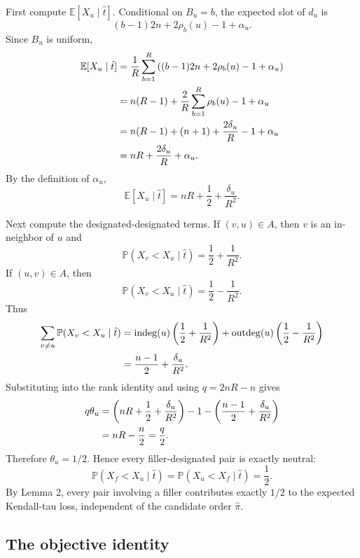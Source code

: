 \documentclass[11pt]{article}
\newcommand{\E}{\mathbb{E}}
\newcommand{\Prb}{\mathbb{P}}
\newcommand{\indeg}{\operatorname{indeg}}
\newcommand{\outdeg}{\operatorname{outdeg}}
\begin{document}
First compute $\E[X_u\mid \hat t]$.  Conditional on $B_u=b$, the expected slot of $d_u$ is
\begin{equation}
  (b-1)2n+2\rho_b(u)-1+\alpha_u.
\end{equation}
Since $B_u$ is uniform,
\begin{align}
  \E[X_u\mid \hat t]
  &=\frac1R\sum_{b=1}^R\left((b-1)2n+2\rho_b(u)-1+\alpha_u\right) \notag\\
  &=n(R-1)+\frac2R\sum_{b=1}^R\rho_b(u)-1+\alpha_u \notag\\
  &=n(R-1)+(n+1)+\frac{2\delta_u}{R}-1+\alpha_u \notag\\
  &=nR+\frac{2\delta_u}{R}+\alpha_u.
\end{align}
By the definition of $\alpha_u$,
\begin{equation}
  \E[X_u\mid \hat t]=nR+\frac12+\frac{\delta_u}{R^2}.
\end{equation}

Next compute the designated-designated terms.  If $(v,u)\in A$, then $v$ is an in-neighbor of $u$ and
\begin{equation}
  \Prb(X_v<X_u\mid \hat t)=\frac12+\frac1{R^2}.
\end{equation}
If $(u,v)\in A$, then
\begin{equation}
  \Prb(X_v<X_u\mid \hat t)=\frac12-\frac1{R^2}.
\end{equation}
Thus
\begin{align}
  \sum_{v\ne u}\Prb(X_v<X_u\mid \hat t)
  &=\indeg(u)\left(\frac12+\frac1{R^2}\right)
    +\outdeg(u)\left(\frac12-\frac1{R^2}\right) \notag\\
  &=\frac{n-1}{2}+\frac{\delta_u}{R^2}.
\end{align}
Substituting into the rank identity and using $q=2nR-n$ gives
\begin{align}
  q\theta_u
  &=\left(nR+\frac12+\frac{\delta_u}{R^2}\right)-1
    -\left(\frac{n-1}{2}+\frac{\delta_u}{R^2}\right) \notag\\
  &=nR-\frac n2
  =\frac q2.
\end{align}
Therefore $\theta_u=1/2$.  Hence every filler-designated pair is exactly neutral:
\begin{equation}
  \Prb(X_f<X_u\mid \hat t)=\Prb(X_u<X_f\mid \hat t)=\frac12.
\end{equation}
By Lemma 2, every pair involving a filler contributes exactly $1/2$ to the expected Kendall-tau loss, independent of the candidate order $\hat\pi$.

\subsection{The objective identity}
\end{document}
